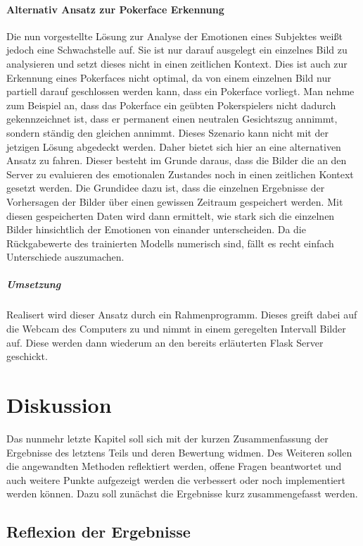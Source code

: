 \documentclass[12pt, a4paper]{scrbook}
\begin{document}
\subsubsection{Alternativ Ansatz zur Pokerface Erkennung}
Die nun vorgestellte Lösung zur Analyse der Emotionen eines Subjektes weißt jedoch eine Schwachstelle auf. Sie ist nur darauf ausgelegt ein einzelnes Bild zu analysieren und setzt dieses nicht in einen zeitlichen Kontext. Dies ist auch zur Erkennung eines Pokerfaces nicht optimal, da von einem einzelnen Bild nur partiell darauf geschlossen werden kann, dass ein Pokerface vorliegt. Man nehme zum Beispiel an, dass das Pokerface ein geübten Pokerspielers nicht dadurch gekennzeichnet ist, dass er permanent einen neutralen Gesichtszug annimmt, sondern ständig den gleichen annimmt. Dieses Szenario kann nicht mit der jetzigen Lösung abgedeckt werden. Daher bietet sich hier an eine alternativen Ansatz zu fahren. Dieser besteht im Grunde daraus, dass die Bilder die an den Server zu evaluieren des emotionalen Zustandes noch in einen zeitlichen Kontext gesetzt werden. Die Grundidee dazu ist, dass die einzelnen Ergebnisse der Vorhersagen der Bilder über einen gewissen Zeitraum gespeichert werden. Mit diesen gespeicherten Daten wird dann ermittelt, wie stark sich die einzelnen Bilder hinsichtlich der Emotionen von einander unterscheiden. Da die Rückgabewerte des trainierten Modells numerisch sind, fällt es recht einfach Unterschiede auszumachen. 
\paragraph{Umsetzung}
Realisert wird dieser Ansatz durch ein Rahmenprogramm. Dieses greift dabei auf die Webcam des Computers zu und nimmt in einem geregelten Intervall Bilder auf. Diese werden dann wiederum an den bereits erläuterten Flask Server geschickt.
\let\cleardoublepage\relax
\chapter{Diskussion}
Das nunmehr letzte Kapitel soll sich mit der kurzen Zusammenfassung der Ergebnisse des letztens Teils und deren Bewertung widmen. 
Des Weiteren sollen die angewandten Methoden reflektiert werden,
offene Fragen beantwortet und auch weitere Punkte aufgezeigt werden die verbessert oder noch implementiert werden können. Dazu soll zunächst die Ergebnisse kurz zusammengefasst werden.

\section{Reflexion der Ergebnisse}
\end{document}
